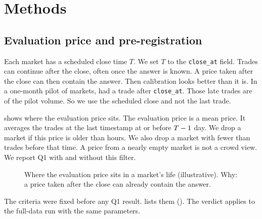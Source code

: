\section{Methods}\label{sec:methods}
\subsection{Evaluation price and pre-registration}\label{sec:methods-prereg}
Each market has a scheduled close time $T$.
We set $T$ to the \texttt{close\_at} field.
Trades can continue after the close, often once the answer is known.
A price taken after the close can then contain the answer.
Then calibration looks better than it is.
In a one-month pilot of \PilotNMarkets{} markets, \PilotShareMarketsAfterClose{} had a trade after \texttt{close\_at}.
Those late trades are \PilotShareVolumeAfterClose{} of the pilot volume.
So we use the scheduled close and not the last trade.

 shows where the evaluation price sits.
The evaluation price \pOne{} is a mean price.
It averages the trades at the last timestamp at or before $T-1$ day.
We drop a market if this price is older than \MaxStaleHours{} hours.
We also drop a market with fewer than \MinTrades{} trades before that time.
A price from a nearly empty market is not a crowd view.
We report Q1 with and without this filter.

\begin{figure}[t]
\centering
{}
\caption{Where the evaluation price sits in a market's life (illustrative). Why: a price taken after the close can already contain the answer.}%
\label{fig:timeline}
\end{figure}

The criteria were fixed before any Q1 result.
 lists them ().
The verdict applies to the full-data run with the same parameters.

